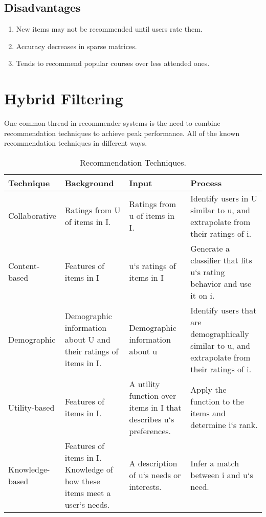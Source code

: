 \subsection{Disadvantages}
\begin{enumerate}
  \item \textsf{New items may not be recommended until users rate them.}
  \item \textsf{Accuracy decreases in sparse matrices.}
  \item \textsf{Tends to recommend popular courses over less attended ones.}
\end{enumerate}

\section{Hybrid Filtering}

One common thread in recommender systems is the need to combine recommendation techniques to 
achieve peak performance. All of the known recommendation techniques in different ways.

\begin{table}[H]
\center
\begin{tabular}{ p{3cm} p{3cm} p{3cm} p{3cm}  }
  \hline
  \textbf{Technique} &\textbf{Background} &\textbf{Input } &\textbf{Process} \\
  \hline
  Collaborative &Ratings from U of items in I. &Ratings from u of items in I. &Identify users in U similar to u, and extrapolate from their ratings of i. \\
  Content-based &Features of items in I   &u`s ratings of items in I &Generate a classifier that fits u`s rating behavior and use it on i. \\
  Demographic &Demographic information about U and their ratings of items in I. & Demographic information about u &Identify users that are demographically similar to u, and extrapolate from their ratings of i. \\
  Utility-based &Features of items in I. &A utility function over items in I that describes u`s preferences. &Apply the function to the items and determine i`s rank. \\
  Knowledge-based &Features of items in I. Knowledge of how these items meet a user`s needs. &A description of u`s needs or interests. &Infer a match between i and u`s need.\\
  \hline
\end{tabular}
\caption{Recommendation Techniques.}
\end{table}

